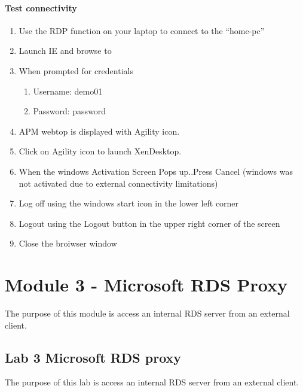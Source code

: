\documentclass[letterpaper,10pt,english]{sphinxmanual}
\begin{document}
\paragraph{Test connectivity}
\label{\detokenize{class2/module2/lab1:id6}}\begin{enumerate}
\item {} 
Use the RDP function on your laptop to connect to the “home-pc”

\item {} 
Launch IE and browse to 

\item {} 
When prompted for credentials
\begin{enumerate}
\item {} 
Username: demo01

\item {} 
Password: password

\end{enumerate}

\item {} 
APM webtop is displayed with Agility icon.

\item {} 
Click on Agility icon to launch XenDesktop.

\item {} 
When the windows Activation Screen Pops up..Press Cancel (windows was
not activated due to external connectivity limitations)

\item {} 
Log off using the windows start icon in the lower left
corner

\item {} 
Logout using the Logout button in the upper right corner of the
screen

\item {} 
Close the broiwser window

\end{enumerate}


\section{Module 3 - Microsoft RDS Proxy}
\label{\detokenize{class2/module3/module3::doc}}\label{\detokenize{class2/module3/module3:module-3-microsoft-rds-proxy}}
The purpose of this module is access an internal RDS server from an
external client.


\subsection{Lab 3 \textendash{} Microsoft RDS proxy}
\label{\detokenize{class2/module3/lab1::doc}}\label{\detokenize{class2/module3/lab1:lab-3-microsoft-rds-proxy}}
The purpose of this lab is access an internal RDS server from an
external client.
\end{document}
